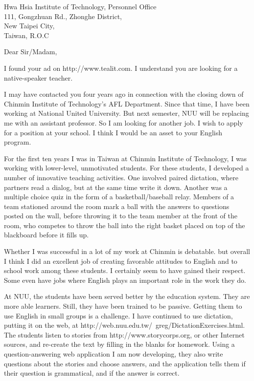 \documentclass{letter}
\begin{document}
\begin{letter}{
Hwa Hsia Institute of Technology, Personnel Office \\ 111, Gongzhuan Rd., Zhonghe District, \\ New Taipei City, \\ Taiwan, R.O.C}
\opening{Dear Sir/Madam,}

I found your ad on http://www.tealit.com. I understand you are looking for a native-speaker teacher.

I may have contacted you four years ago in connection with the closing down of Chinmin Institute of Technology's AFL Department. Since that time, I have been working at National United University. But next semester, NUU will be replacing me with an assistant professor. So I am looking for another job. I wish to apply for a position at your school. I think I would be an asset to your English program.

For the first ten years I was in Taiwan at Chinmin Institute of Technology, I was working with lower-level, unmotivated students. For these students, I developed a number of innovative teaching activities. One involved paired dictation, where partners read a dialog, but at the same time write it down. Another was a multiple choice quiz in the form of a basketball/baseball relay. Members of a team stationed around the room mark a ball with the answers to questions posted on the wall, before throwing it to the team member at the front of the room, who competes to throw the ball into the right basket placed on top of the blackboard before it fills up.

Whether I was successful in a lot of my work at Chinmin is debatable. but overall I think I did an excellent job of creating favorable attitudes to English and to school work among these students. I certainly seem to have gained their respect. Some even have jobs where English plays an important role in the work they do.

At NUU, the students have been served better by the education system. They are more able learners. Still, they have been trained to be passive. Getting them to use English in small groups is a challenge. I have continued to use dictation, putting it on the web, at http://web.nuu.edu.tw/~greg/DictationExercises.html. The students listen to stories from http://www.storycorps.org, or other Internet sources, and re-create the text by filling in the blanks for homework. Using a question-answering web application I am now developing, they also write questions about the stories and choose answers, and the application tells them if their question is grammatical, and if the answer is correct.


\end{letter}
\end{document}

